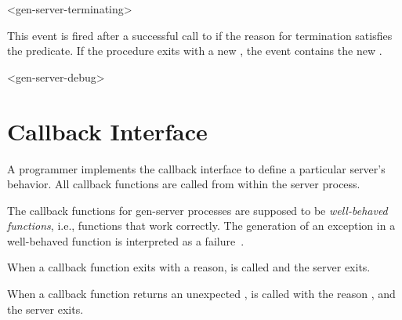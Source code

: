 \begin{pubevent}{<gen-server-terminating>}
\end{pubevent}

This event is fired after a successful call to 
if the reason for termination satisfies the 
predicate.
If the  procedure exits with a
new , the event contains the new .

\begin{pubevent}{<gen-server-debug>}
\end{pubevent}

\section {Callback Interface}\label{sec:gen-server-callback}

A programmer implements the callback interface to define a particular
server's behavior. All callback functions are called from within the
server process.

The callback functions for gen-server processes are supposed to be
\emph{well-behaved functions}, i.e., functions that work
correctly. The generation of an exception in a well-behaved function
is interpreted as a failure~\cite{armstrong-thesis}.

When a callback function exits with a reason,  is
called and the server exits.

When a callback function returns an unexpected ,
 is called with the reason
, and the server exits.

